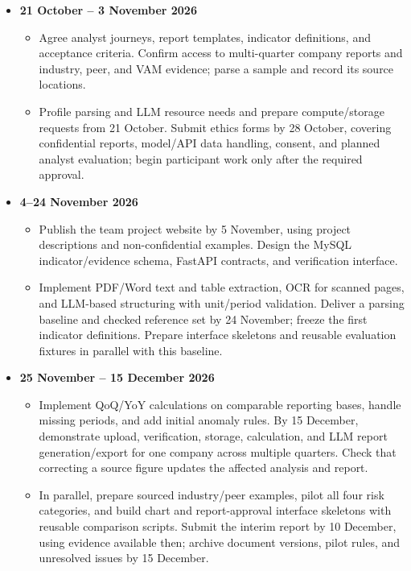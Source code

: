 \documentclass[a4paper,12pt]{article}
\begin{document}
\begin{itemize}
  \item \textbf{21 October -- 3 November 2026}
    \begin{itemize}
      \item Agree analyst journeys, report templates, indicator definitions, and acceptance criteria. Confirm access to multi-quarter company reports and industry, peer, and VAM evidence; parse a sample and record its source locations.
      \item Profile parsing and LLM resource needs and prepare compute/storage requests from 21 October. Submit ethics forms by 28 October, covering confidential reports, model/API data handling, consent, and planned analyst evaluation; begin participant work only after the required approval.
    \end{itemize}

  \item \textbf{4--24 November 2026}
    \begin{itemize}
      \item Publish the team project website by 5 November, using project descriptions and non-confidential examples. Design the MySQL indicator/evidence schema, FastAPI contracts, and verification interface.
      \item Implement PDF/Word text and table extraction, OCR for scanned pages, and LLM-based structuring with unit/period validation. Deliver a parsing baseline and checked reference set by 24 November; freeze the first indicator definitions. Prepare interface skeletons and reusable evaluation fixtures in parallel with this baseline.
    \end{itemize}

  \item \textbf{25 November -- 15 December 2026}
    \begin{itemize}
      \item Implement QoQ/YoY calculations on comparable reporting bases, handle missing periods, and add initial anomaly rules. By 15 December, demonstrate upload, verification, storage, calculation, and LLM report generation/export for one company across multiple quarters. Check that correcting a source figure updates the affected analysis and report.
      \item In parallel, prepare sourced industry/peer examples, pilot all four risk categories, and build chart and report-approval interface skeletons with reusable comparison scripts. Submit the interim report by 10 December, using evidence available then; archive document versions, pilot rules, and unresolved issues by 15 December.
    \end{itemize}


\end{itemize}
\end{document}
